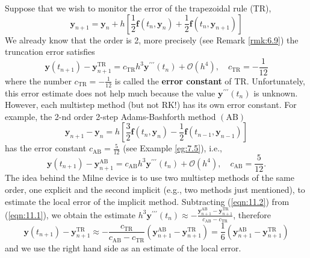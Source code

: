 \documentclass[a4paper]{article}
\begin{document}
\begin{technique}
    Suppose that we wish to monitor the error of the trapezoidal rule (TR),
\[
\mathbf{y}_{n+1}=\mathbf{y}_n+h\left[\frac{1}{2} \mathbf{f}\left(t_n, \mathbf{y}_n\right)+\frac{1}{2} \mathbf{f}\left(t_n, \mathbf{y}_{n+1}\right)\right]
\]
We already know that the order is 2, more precisely (see Remark \ref{rmk:6.9}) the truncation error satisfies
\begin{equation}\label{eqn:11.1}
    \mathbf{y}\left(t_{n+1}\right)-\mathbf{y}_{n+1}^{\mathrm{TR}}=c_{\mathrm{TR}} h^3 \mathbf{y}^{\prime \prime \prime}\left(t_n\right)+\mathcal{O}\left(h^4\right), \quad c_{\mathrm{TR}}=-\frac{1}{12}
\end{equation}
where the number $c_{\mathrm{TR}}=-\frac{1}{12}$ is called the \textbf{error constant} of TR. Unfortunately, this error estimate does not help much because the value $\mathbf{y}^{\prime \prime \prime}\left(t_n\right)$ is unknown. However, each multistep method (but not RK!) has its own error constant. For example, the 2-nd order 2-step Adams-Bashforth method $(\mathrm{AB})$
\[
\mathbf{y}_{n+1}-\mathbf{y}_n=h\left[\frac{3}{2} \mathbf{f}\left(t_n, \mathbf{y}_n\right)-\frac{1}{2} \mathbf{f}\left(t_{n-1}, \mathbf{y}_{n-1}\right)\right]
\]
has the error constant $c_{\mathrm{AB}}=\frac{5}{12}$ (see Example \ref{eg:7.5}), i.e.,
\begin{equation}\label{eqn:11.2}
    \mathbf{y}\left(t_{n+1}\right)-\mathbf{y}_{n+1}^{\mathrm{AB}}=c_{\mathrm{AB}} h^3 \mathbf{y}^{\prime \prime \prime}\left(t_n\right)+\mathcal{O}\left(h^4\right), \quad c_{\mathrm{AB}}=\frac{5}{12} .
\end{equation}
The idea behind the Milne device is to use two multistep methods of the same order, one explicit and the second implicit (e.g., two methods just mentioned), to estimate the local error of the implicit method. Subtracting (\ref{eqn:11.2}) from (\ref{eqn:11.1}), we obtain the estimate $h^3 \mathbf{y}^{\prime \prime \prime}\left(t_n\right) \approx-\frac{\mathbf{y}_{n+1}^{\mathrm{AB}}-\mathbf{y}_{n+1}^{\mathrm{TR}}}{c_{\mathrm{AB}}-c_{\mathrm{TR}}}$, therefore
\begin{equation}\label{eqn:11.3}
    \mathbf{y}\left(t_{n+1}\right)-\mathbf{y}_{n+1}^{\mathrm{TR}} \approx-\frac{c_{\mathrm{TR}}}{c_{\mathrm{AB}}-c_{\mathrm{TR}}}\left(\mathbf{y}_{n+1}^{\mathrm{AB}}-\mathbf{y}_{n+1}^{\mathrm{TR}}\right)=\frac{1}{6}\left(\mathbf{y}_{n+1}^{\mathrm{AB}}-\mathbf{y}_{n+1}^{\mathrm{TR}}\right)
\end{equation}
and we use the right hand side as an estimate of the local error.
\end{technique}
\end{document}
